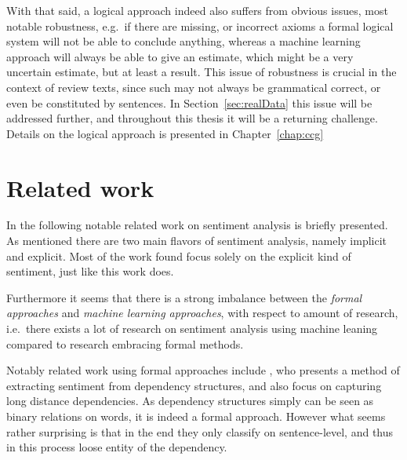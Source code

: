 With that said, a logical approach indeed also suffers from obvious issues, most notable robustness, e.g.\ if there are missing, or incorrect axioms a formal logical system will not be able to conclude anything, whereas a machine learning approach will always be able to give an estimate, which might be a very uncertain estimate, but at least a result. This issue of robustness is crucial in the context of review texts, since such may not always be grammatical correct, or even be constituted by sentences. In Section~\ref{sec:realData} this issue will be addressed further, and throughout this thesis it will be a returning challenge. Details on the logical approach is presented in Chapter~\ref{chap:ccg}	

\section{Related work}
\label{sec:relatedWork}
In the following notable related work on sentiment analysis is briefly presented. As mentioned there are two main flavors of sentiment analysis, namely implicit and explicit. Most of the work found focus solely on the explicit kind of sentiment, just like this work does. 

Furthermore it seems that there is a strong imbalance between the \emph{formal approaches} and \emph{machine learning approaches}, with respect to amount of research, i.e.\ there exists a lot of research on sentiment analysis using machine leaning compared to research embracing formal methods. 


Notably related work using formal approaches include \citeauthor{dependencySentiment} , who presents a method of extracting sentiment from dependency structures, and also focus on capturing long distance dependencies. As dependency structures simply can be seen as binary relations on words, it is indeed a formal approach. However what seems rather surprising is that in the end they only classify on sentence-level, and thus in this process loose entity of the dependency.

